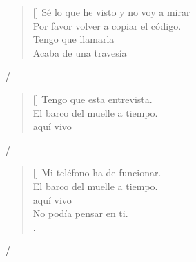 \documentclass[grid,avery5371]{flashcards}
\begin{document}
\begin{flashcard}{%
\begin{verse}[\versewidth]
Sé lo que he visto y no voy a  mirar\\
Por favor volver a copiar el código.\\
Tengo que  llamarla\\
Acaba de  una travesía
\end{verse}
}
  /    
\end{flashcard}


\begin{flashcard}{%
\begin{verse}[\versewidth]
Tengo que  esta entrevista.\\
El barco  del muelle a tiempo.\\
 aquí vivo

\end{verse}
}
  /    
\end{flashcard}

\begin{flashcard}{%
\begin{verse}[\versewidth]
Mi teléfono ha  de funcionar.\\
El barco  del muelle a tiempo.\\
 aquí vivo\\
No podía  pensar en ti.\\
. \\
\end{verse}
\hfill \break
{}


}
  /    
\end{flashcard}
\end{document}
